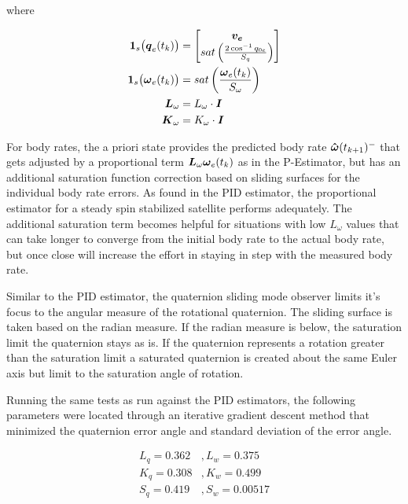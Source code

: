 where

\begin{subequations}
  \begin{align}
    \boldsymbol{1}_s\big(\boldsymbol{q}_{e}(t_k) \big) &= \begin{bmatrix} \boldsymbol{v_e} \\ sat\left( \frac{2\cos^{-1} q_{0e} }{S_{q}} \right) \end{bmatrix} \\
    \boldsymbol{1}_s \big(\boldsymbol{\omega}_e(t_{k}) \big) &= sat\left( \frac{\boldsymbol{\omega}_e(t_{k})}{S_{\omega}} \right) \\
    \boldsymbol{L}_{\omega} &= L_\omega \cdot \boldsymbol{I} \\
    \boldsymbol{K}_{\omega} &= K_\omega \cdot \boldsymbol{I}
  \end{align}
\end{subequations}

For body rates, the a priori state provides the predicted body rate $\boldsymbol{\hat{\omega}}(t_{k+1})^-$ that gets adjusted by a proportional term $\boldsymbol{L}_{\omega} \boldsymbol{\omega}_e(t_{k})$ as in the P-Estimator, but has an additional saturation function correction based on sliding surfaces for the individual body rate errors.  As found in the PID estimator, the proportional estimator for a steady spin stabilized satellite performs adequately.  The additional saturation term becomes helpful for situations with low $L_\omega$ values that can take longer to converge from the initial body rate to the actual body rate, but once close will increase the effort in staying in step with the measured body rate.

Similar to the PID estimator, the quaternion sliding mode observer limits it's focus to the angular measure of the rotational quaternion.  The sliding surface is taken based on the radian measure.  If the radian measure is below, the saturation limit the quaternion stays as is.  If the quaternion represents a rotation greater than the saturation limit a saturated quaternion is created about the same Euler axis but limit to the saturation angle of rotation.

Running the same tests as run against the PID estimators, the following parameters were located through an iterative gradient descent method that minimized the quaternion error angle and standard deviation of the error angle.

\begin{equation}
  \begin{aligned}
    L_q = 0.362 &, L_w = 0.375 \\
    K_q = 0.308 &, K_w = 0.499 \\
    S_q = 0.419 &, S_w = 0.00517 \\
  \end{aligned}
\end{equation}

